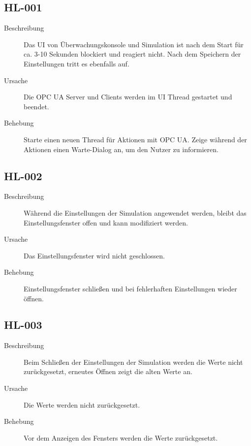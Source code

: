 \documentclass[parskip=full]{scrartcl}
\begin{document}
\subsection{HL-001}
\begin{description}
	\item[Beschreibung] Das UI von Überwachungskonsole und Simulation ist nach dem Start für ca. 3-10 Sekunden blockiert und reagiert nicht. Nach dem Speichern der Einstellungen tritt es ebenfalls auf.
	\item[Ursache] Die OPC UA Server und Clients werden im UI Thread gestartet und beendet.
	\item[Behebung] Starte einen neuen Thread für Aktionen mit OPC UA. Zeige während der Aktionen einen Warte-Dialog an, um den Nutzer zu informieren.
\end{description}

\subsection{HL-002}
\begin{description}
	\item[Beschreibung] Während die Einstellungen der Simulation angewendet werden, bleibt das Einstellungsfenster offen und kann modifiziert werden.
	\item[Ursache] Das Einstellungsfenster wird nicht geschlossen.
	\item[Behebung] Einstellungsfenster schließen und bei fehlerhaften Einstellungen wieder öffnen.
\end{description}

\subsection{HL-003}
\begin{description}
	\item[Beschreibung] Beim Schließen der Einstellungen der Simulation werden die Werte nicht zurückgesetzt, erneutes Öffnen zeigt die alten Werte an.
	\item[Ursache] Die Werte werden nicht zurückgesetzt.
	\item[Behebung] Vor dem Anzeigen des Fensters werden die Werte zurückgesetzt.
\end{description}

\pagebreak
{}
{}
\listoffigures
\end{document}
